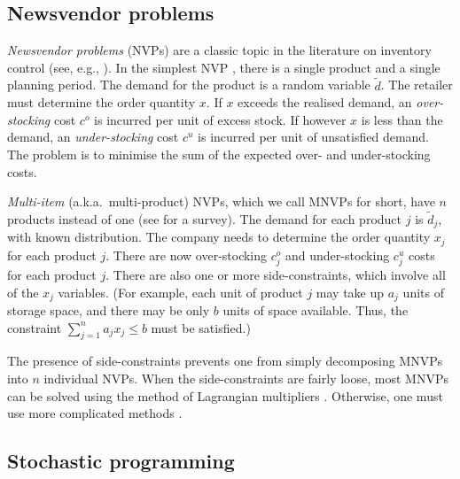 \documentclass[a4paper,11pt]{article}
\begin{document}
\subsection{Newsvendor problems} \label{sub:lit1}

\emph{Newsvendor problems} (NVPs) are a classic topic in the literature on inventory control (see, e.g., \cite{Ch12,Po02,Zi00}). In the simplest NVP \cite{HW63}, there is a single product and a single planning period. The demand for the product is a random variable $\tilde d$. The retailer must determine the order quantity $x$. If $x$ exceeds the realised demand, an \emph{over-stocking} cost $c^o$ is incurred per unit of excess stock. If however $x$ is less than the demand, an \emph{under-stocking} cost $c^u$ is incurred per unit of unsatisfied demand. The problem is to minimise the sum of the expected over- and under-stocking costs.

\emph{Multi-item} (a.k.a.\ multi-product) NVPs, which we call MNVPs for short, have $n$ products instead of one (see \cite{Tu12} for a survey). The demand for each product $j$ is $\tilde d_j$, with known distribution. The company needs to determine the order quantity $x_j$ for each product $j$. There are now over-stocking $c^o_j$ and under-stocking $c^u_j$ costs for each product $j$. There are also one or more side-constraints, which involve all of the $x_j$ variables. (For example, each unit of product $j$ may take up $a_j$ units of storage space, and there may be only $b$ units of space available. Thus, the constraint $\sum_{j=1}^n a_j x_j \le b$ must be satisfied.)

The presence of side-constraints prevents one from simply decomposing MNVPs into $n$ individual NVPs. When the side-constraints are fairly loose, most MNVPs can be solved using the method of Lagrangian multipliers \cite{BR93,HW63}. Otherwise, one must use more complicated methods \cite{AM05,LL95,ZXH09}. 

\subsection{Stochastic programming} \label{sub:lit2}
\end{document}
